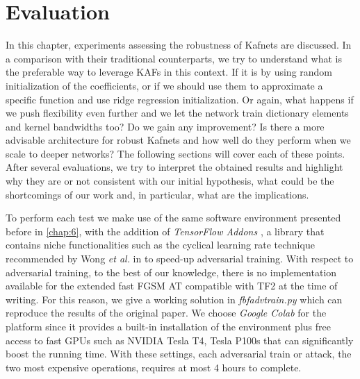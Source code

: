 \documentclass[LaM,binding=0.6cm]{./packages/sapthesis/sapthesis}
\begin{document}
       

        


\chapter{Evaluation}
\label{chap:7}
In this chapter, experiments assessing the robustness of Kafnets are discussed. In a comparison with their traditional counterparts, we try to understand 
what is the preferable way to leverage KAFs in this context. If it is by using random initialization of the coefficients, or if we should use them 
to approximate a specific function and use ridge regression initialization. Or again, what happens if we push flexibility even further and we let 
the network train dictionary elements and kernel bandwidths too? Do we gain any improvement? Is there a more advisable architecture for robust 
Kafnets and how well do they perform when we scale to deeper networks? The following sections will cover each of these points. After several evaluations,
we try to interpret the obtained results and highlight why they are or not consistent with our initial hypothesis, what could be the shortcomings of our 
work and, in particular, what are the implications. \par
To perform each test we make use of the same software environment presented before in \ref{chap:6}, with the addition of \textit{TensorFlow Addons} \cite{tf2},
a library that contains niche functionalities such as the cyclical learning rate technique recommended by Wong \textit{et al.} in \cite{fast_adv_train} to speed-up adversarial training. 
With respect to adversarial training, to the best of our knowledge, there is no implementation available for the extended fast FGSM AT compatible with TF2
at the time of writing. For this reason, we give a working solution in \textit{fbfadvtrain.py} which can reproduce the results
of the original paper. We choose \textit{Google Colab} \cite{colab} for the platform since it provides a built-in installation of the environment plus free access 
to fast GPUs such as NVIDIA Tesla T4, Tesla P100s that can significantly boost the running time. With these settings, each adversarial train 
or attack, the two most expensive operations, 
requires at most 4 hours to complete.
\end{document}
